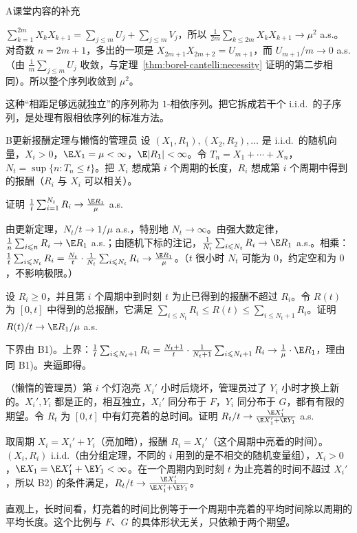 \begin{exercises}{A}{课堂内容的补充}
\begin{solution}
$\sum_{k=1}^{2m}X_kX_{k+1}=\sum_{j\leqslant m}U_j+\sum_{j\leqslant m}V_j$，所以 $\frac1{2m}\sum_{k\leqslant2m}X_kX_{k+1}\to\mu^2$ a.s.。对奇数 $n=2m+1$，多出的一项是 $X_{2m+1}X_{2m+2}=U_{m+1}$，而 $U_{m+1}/m\to0$ a.s.（由 $\frac1m\sum_{j\leqslant m}U_j$ 收敛，与定理~\ref{thm:borel-cantelli:necessity} 证明的第二步相同）。所以整个序列收敛到 $\mu^2$。

这种“相距足够远就独立”的序列称为 $1$-相依序列。把它拆成若干个 i.i.d.\ 的子序列，是处理有限相依序列的标准方法。
\end{solution}
\end{exercises}

\begin{probleme}{B}{更新报酬定理与懒惰的管理员}
设 $(X_1,R_1),(X_2,R_2),\dots$ 是 i.i.d.\ 的随机向量，$X_i>0$，$\E X_1=\mu<\infty$，$\E\abs{R_1}<\infty$。令 $T_n=X_1+\cdots+X_n$，$N_t=\sup\{n:T_n\leqslant t\}$。把 $X_i$ 想成第 $i$ 个周期的长度，$R_i$ 想成第 $i$ 个周期中得到的报酬（$R_i$ 与 $X_i$ 可以相关）。
\begin{questions}
\item 证明 $\frac1t\sum_{i=1}^{N_t}R_i\to\frac{\E R_1}{\mu}$ a.s.
\begin{solution}
由更新定理，$N_t/t\to1/\mu$ a.s.，特别地 $N_t\to\infty$。由强大数定律，$\frac1n\sum_{i\leqslant n}R_i\to \E R_1$ a.s.；由随机下标的注记，$\frac1{N_t}\sum_{i\leqslant N_t}R_i\to \E R_1$ a.s.。相乘：$\frac1t\sum_{i\leqslant N_t}R_i=\frac{N_t}t\cdot\frac1{N_t}\sum_{i\leqslant N_t}R_i\to\frac{\E R_1}\mu$。（$t$ 很小时 $N_t$ 可能为 $0$，约定空和为 $0$，不影响极限。）
\end{solution}
\item 设 $R_i\geqslant0$，并且第 $i$ 个周期中到时刻 $t$ 为止已得到的报酬不超过 $R_i$。令 $R(t)$ 为 $[0,t]$ 中得到的总报酬，它满足 $\sum_{i\leqslant N_t}R_i\leqslant R(t)\leqslant\sum_{i\leqslant N_t+1}R_i$。证明 $R(t)/t\to \E R_1/\mu$ a.s.
\begin{solution}
下界由 B1)。上界：$\frac1t\sum_{i\leqslant N_t+1}R_i=\frac{N_t+1}t\cdot\frac1{N_t+1}\sum_{i\leqslant N_t+1}R_i\to\frac1\mu\cdot \E R_1$，理由同 B1)。夹逼即得。
\end{solution}
\item （懒惰的管理员）第 $i$ 个灯泡亮 $X_i'$ 小时后烧坏，管理员过了 $Y_i$ 小时才换上新的。$X_i',Y_i$ 都是正的，相互独立，$X_i'$ 同分布于 $F$，$Y_i$ 同分布于 $G$，都有有限的期望。令 $R_t$ 为 $[0,t]$ 中有灯亮着的总时间。证明 $R_t/t\to\frac{\E X_1'}{\E X_1'+\E Y_1}$ a.s.
\begin{solution}
取周期 $X_i=X_i'+Y_i$（亮加暗），报酬 $R_i=X_i'$（这个周期中亮着的时间）。$(X_i,R_i)$ i.i.d.（由分组定理，不同的 $i$ 用到的是不相交的随机变量组），$X_i>0$，$\E X_1=\E X_1'+\E Y_1<\infty$。在一个周期内到时刻 $t$ 为止亮着的时间不超过 $X_i'$，所以 B2) 的条件满足，$R_t/t\to\frac{\E X_1'}{\E X_1'+\E Y_1}$。

直观上，长时间看，灯亮着的时间比例等于一个周期中亮着的平均时间除以周期的平均长度。这个比例与 $F$、$G$ 的具体形状无关，只依赖于两个期望。
\end{solution}
\end{questions}
\end{probleme}

